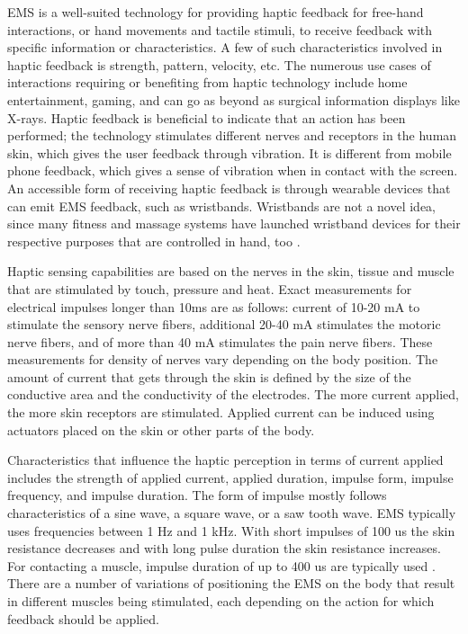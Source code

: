 EMS is a well-suited technology for providing haptic feedback for free-hand interactions, or hand movements and tactile stimuli, to receive feedback with specific information or characteristics. A few of such characteristics involved in haptic feedback is strength, pattern, velocity, etc. 
The numerous use cases of interactions requiring or benefiting from haptic technology include home entertainment, gaming, and can go as beyond as surgical information displays like X-rays. Haptic feedback is beneficial to indicate that an action has been performed; the technology stimulates different nerves and receptors in the human skin, which gives the user feedback through vibration. It is different from mobile phone feedback, which gives a sense of vibration when in contact with the screen.  An accessible form of receiving haptic feedback is through wearable devices that can emit EMS feedback, such as wristbands. Wristbands are not a novel idea, since many fitness and massage systems have launched wristband devices for their respective purposes that are controlled in hand, too \cite{emsDesign}.  


Haptic sensing capabilities are based on the nerves in the skin, tissue and muscle that are stimulated by touch, pressure and heat. Exact measurements for electrical impulses longer than 10ms are as follows: current of 10-20 mA to stimulate the sensory nerve fibers, additional 20-40 mA stimulates the motoric nerve fibers, and of more than 40 mA stimulates the pain nerve fibers. These measurements for density of nerves vary depending on the body position. The amount of current that gets through the skin is defined by the size of the conductive area and the conductivity of the electrodes. The more current applied, the more skin receptors are stimulated. Applied current can be induced using actuators placed on the skin or other parts of the body. 


Characteristics that influence the haptic perception in terms of current applied includes the strength of applied current, applied duration, impulse form, impulse frequency, and impulse duration. The form of impulse mostly follows characteristics of a sine wave, a square wave, or a saw tooth wave. EMS typically uses frequencies between 1 Hz and 1 kHz. With short impulses of 100 us the skin resistance decreases and with long pulse duration the skin resistance increases. For contacting a muscle, impulse duration of up to 400 us are typically used \cite{emsDesign, toolkit}. There are a number of variations of positioning the EMS on the body that result in different muscles being stimulated, each depending on the action for which feedback should be applied. 

